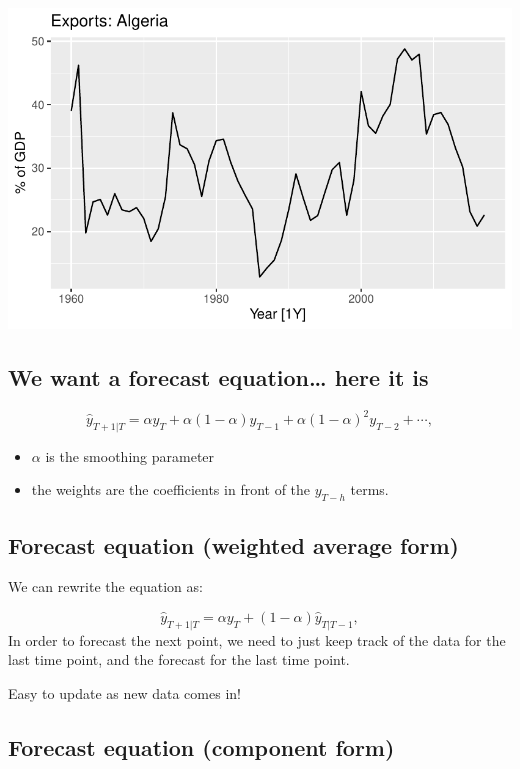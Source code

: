 \documentclass[
  letterpaper,
  DIV=11,
  numbers=noendperiod]{scrartcl}
\providecommand{\tightlist}{%
  \setlength{\itemsep}{0pt}\setlength{\parskip}{0pt}}\usepackage{longtable,booktabs,array}
\begin{document}
\includegraphics{Lecture12_files/figure-pdf/unnamed-chunk-15-1.pdf}

\subsection{We want a forecast equation\ldots{} here it
is}\label{we-want-a-forecast-equation-here-it-is}

\[
\begin{equation}
  \hat{y}_{T+1|T} = \alpha y_T + \alpha(1-\alpha) y_{T-1} + \alpha(1-\alpha)^2 y_{T-2}+ \cdots,   \tag{8.1}
\end{equation}
\]

\begin{itemize}
\tightlist
\item
  \(\alpha\) is the smoothing parameter
\item
  the weights are the coefficients in front of the \(y_{T-h}\) terms.
\end{itemize}

\subsection{Forecast equation (weighted average
form)}\label{forecast-equation-weighted-average-form}

We can rewrite the equation as:

\[
\hat{y}_{T+1|T} = \alpha y_T + (1-\alpha) \hat{y}_{T|T-1},
\] In order to forecast the next point, we need to just keep track of
the data for the last time point, and the forecast for the last time
point.

Easy to update as new data comes in!

\subsection{Forecast equation (component
form)}\label{forecast-equation-component-form}
\end{document}
